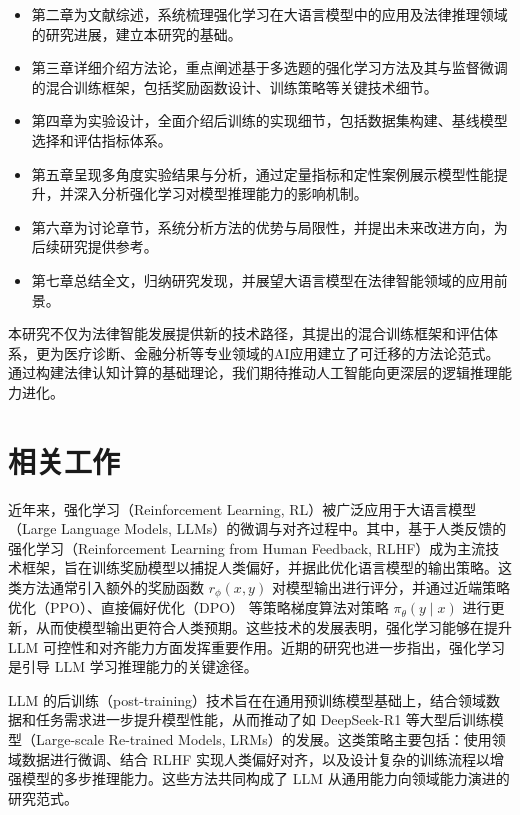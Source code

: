 \documentclass{pkuthesis}
\begin{document}
\begin{itemize}
    \item 第二章为文献综述，系统梳理强化学习在大语言模型中的应用及法律推理领域的研究进展，建立本研究的基础。
    
    \item 第三章详细介绍方法论，重点阐述基于多选题的强化学习方法及其与监督微调的混合训练框架，包括奖励函数设计、训练策略等关键技术细节。
    
    \item 第四章为实验设计，全面介绍后训练的实现细节，包括数据集构建、基线模型选择和评估指标体系。
    
    \item 第五章呈现多角度实验结果与分析，通过定量指标和定性案例展示模型性能提升，并深入分析强化学习对模型推理能力的影响机制。
    
    \item 第六章为讨论章节，系统分析方法的优势与局限性，并提出未来改进方向，为后续研究提供参考。
    
    \item 第七章总结全文，归纳研究发现，并展望大语言模型在法律智能领域的应用前景。
\end{itemize}

本研究不仅为法律智能发展提供新的技术路径，其提出的混合训练框架和评估体系，更为医疗诊断、金融分析等专业领域的AI应用建立了可迁移的方法论范式。通过构建法律认知计算的基础理论，我们期待推动人工智能向更深层的逻辑推理能力进化。


\section{相关工作}



近年来，强化学习（Reinforcement Learning, RL）被广泛应用于大语言模型（Large Language Models, LLMs）的微调与对齐过程中。其中，基于人类反馈的强化学习（Reinforcement Learning from Human Feedback, RLHF）成为主流技术框架，旨在训练奖励模型以捕捉人类偏好，并据此优化语言模型的输出策略。这类方法通常引入额外的奖励函数 $r_{\phi}(x, y)$ 对模型输出进行评分，并通过近端策略优化（PPO）\cite{schulman2017proximal}、直接偏好优化（DPO）\cite{rafailov2023direct} 等策略梯度算法对策略 $\pi_{\theta}(y \mid x)$ 进行更新，从而使模型输出更符合人类预期。这些技术的发展表明，强化学习能够在提升 LLM 可控性和对齐能力方面发挥重要作用。近期的研究也进一步指出，强化学习是引导 LLM 学习推理能力的关键途径。

LLM 的后训练（post-training）技术旨在在通用预训练模型基础上，结合领域数据和任务需求进一步提升模型性能，从而推动了如 DeepSeek-R1\cite{guo2025deepseek} 等大型后训练模型（Large-scale Re-trained Models, LRMs）的发展。这类策略主要包括：使用领域数据进行微调、结合 RLHF 实现人类偏好对齐，以及设计复杂的训练流程以增强模型的多步推理能力。这些方法共同构成了 LLM 从通用能力向领域能力演进的研究范式。
\end{document}
